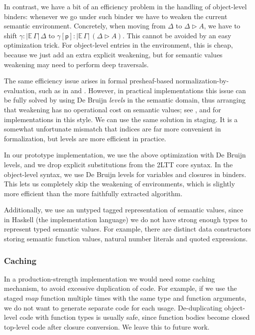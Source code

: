 \documentclass[acmsmall,review]{acmart}
\newcommand{\mit}[1]{\mathit{#1}}
\newcommand{\mbb}[1]{\mathbb{#1}}
\newcommand{\ext}{\triangleright}
\newcommand{\p}{\mathsf{p}}
\newcommand{\ev}{\mbb{E}}
\theoremstyle{remark}
\begin{document}
In contrast, we have a bit of an efficiency problem in the handling of
object-level binders: whenever we go under such binder we have to weaken the
current semantic environment. Concretely, when moving from $\Delta$ to
$\Delta \ext A$, we have to shift $\gamma : |\ev\,\Gamma|\,\Delta$ to
$\gamma[\p] : |\ev\,\Gamma|\,(\Delta \ext A)$. This cannot be avoided by an easy
optimization trick. For object-level entries in the environment, this is cheap,
because we just add an extra explicit weakening, but for semantic values
weakening may need to perform deep traversals.

The same efficiency issue arises in formal presheaf-based
normalization-by-evaluation, such as in \cite{kaposinbe} and
\cite{coquand2018canonicity}. However, in practical implementations this issue
can be fully solved by using De Bruijn \emph{levels} in the semantic domain,
thus arranging that weakening has no operational cost on semantic values; see
\cite{coquand1996algorithm}, \cite{modulartc} and \cite{untypedtc} for
implementations in this style. We can use the same solution in staging. It is a
somewhat unfortunate mismatch that indices are far more convenient in
formalization, but levels are more efficient in practice.

In our prototype implementation, we use the above optimization with De Bruijn
levels, and we drop explicit substitutions from the 2LTT core syntax. In the
object-level syntax, we use De Bruijn levels for variables and closures in
binders. This lets us completely skip the weakening of environments, which is
slightly more efficient than the more faithfully extracted algorithm.

Additionally, we use an untyped tagged representation of semantic
values, since in Haskell (the implementation language) we do not have
strong enough types to represent typed semantic values. For example, there
are distinct data constructors storing semantic function values, natural number
literals and quoted expressions.

\subsubsection{Caching} In a production-strength implementation we would need some
caching mechanism, to avoid excessive duplication of code. For example, if we
use the staged $\mit{map}$ function multiple times with the same type and
function arguments, we do not want to generate separate code for each
usage. De-duplicating object-level code with function types is usually safe,
since function bodies become closed top-level code after closure conversion. We
leave this to future work.
\end{document}
